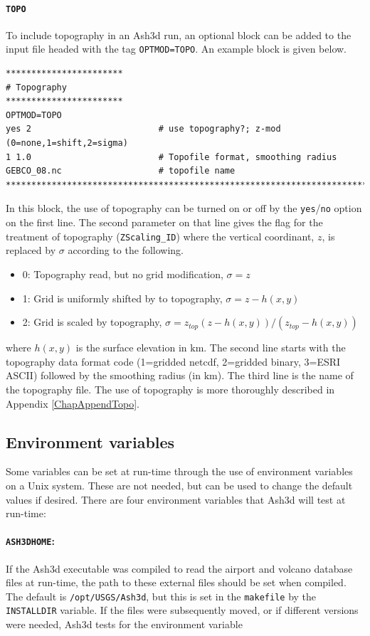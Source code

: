 \paragraph{\texttt{TOPO}}
To include topography in an Ash3d run, an optional block can be added to the
input file headed with the tag \texttt{OPTMOD=TOPO}.
An example block is given below.
\small
\begin{verbatim}
***********************
# Topography
***********************
OPTMOD=TOPO
yes 2                         # use topography?; z-mod (0=none,1=shift,2=sigma)
1 1.0                         # Topofile format, smoothing radius
GEBCO_08.nc                   # topofile name
*******************************************************************************
\end{verbatim}
\normalsize
In this block, the use of topography can be turned on or off by the
\texttt{yes}/\texttt{no} option on the first line. The second parameter on that
line gives the flag for the treatment of topography (\texttt{ZScaling\_ID})
where the vertical coordinant, $z$, is replaced by $\sigma$ according to the following.
\begin{itemize}
 \item 0: Topography read, but no grid modification, $\sigma=z$
 \item 1: Grid is uniformly shifted by to topography, $\sigma=z-h(x,y)$
 \item 2: Grid is scaled by topography, $\sigma=z_{top}(z-h(x,y))/(z_{top}-h(x,y))$
\end{itemize}
where $h(x,y)$ is the surface elevation in $\mathrm{km}$.
The second line starts with the topography data format code
(1=gridded netcdf, 2=gridded binary, 3=ESRI ASCII) followed by the smoothing
radius (in $\mathrm{km}$).
The third line is the name of the topography file. The use of topography is
more thoroughly described in Appendix \ref{ChapAppendTopo}.

\subsection{Environment variables}
Some variables can be set at run-time through the use of environment variables on a Unix
system. These are not needed, but can be used to change the default values if desired.
There are four environment variables that Ash3d will test at run-time:


\paragraph{\texttt{ASH3DHOME}:}
If the Ash3d executable was compiled to read the
airport and volcano database files at
run-time, the path to these external files should be set when compiled. The default is
\texttt{/opt/USGS/Ash3d}, but this is set in the \texttt{makefile} by the \texttt{INSTALLDIR}
variable. If the files were subsequently moved, or if different versions were needed,
Ash3d tests for the environment variable 

